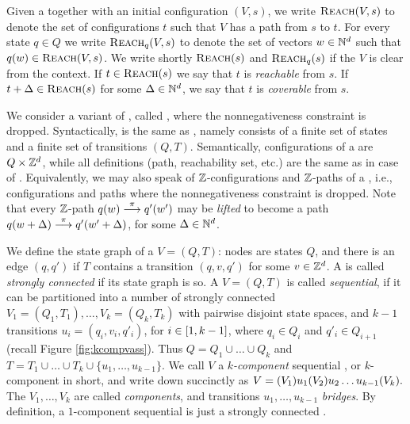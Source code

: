Given a \vass together with an initial configuration $(V, s)$, we write 
$\textsc{Reach}(V,s)$ to denote the set of configurations $t$ such that $V$ has a path from $s$ to $t$.
For every state $q\in Q$ we write $\textsc{Reach}_q(V,s)$ to denote the
set of vectors $w\in\mathbb{N}^d$ such that $q(w) \in \textsc{Reach}(V,s)$.
We write shortly $\textsc{Reach}(s)$ and $\textsc{Reach}_q(s)$ if the \vass $V$
is clear from the context.
If $t\in\textsc{Reach}(s)$ we say that $t$ is \emph{reachable} from $s$.
If $t+\Delta\in\textsc{Reach}(s)$ for some $\Delta\in\mathbb{N}^d$, we say that $t$ is \emph{coverable} from $s$.

We consider a variant of \vass, called \zvass, where the nonnegativeness constraint is dropped.
Syntactically, \zvass is the same as \vass, namely consists of a finite set of states and a finite set of transitions
$(Q, T)$. 
Semantically, configurations of a \zvass are $Q \times \mathbb{Z}^d$, while
all definitions (path, reachability set, etc.) are the same as in case of \vass.
Equivalently, we may also speak of $\mathbb{Z}$-configurations and $\mathbb{Z}$-paths of a \vass, i.e., 
configurations and paths where the nonnegativeness constraint is dropped.
Note that every $\mathbb{Z}$-path $q(w) \stackrel{\pi}{\longrightarrow} q'(w')$ may be \emph{lifted} to become a path
$q(w+\Delta) \stackrel{\pi}{\longrightarrow} q'(w'+\Delta)$, for some $\Delta \in \mathbb{N}^d$.



We define the state graph of a \vass $V = (Q, T)$: nodes are states $Q$, and there is an edge
$(q,q')$ if $T$ contains a transition $(q, v, q')$ for some $v\in\mathbb{Z}^d$.
A \vass is called \emph{strongly connected} if its state graph is so.
A \vass $V = (Q, T)$ is called \emph{sequential},
if it can be partitioned into a number of strongly connected 
\vass $V_1=(Q_1, T_1), \ldots, V_k=(Q_k, T_k)$ with pairwise disjoint state spaces, 
and $k-1$ transitions
$u_i=(q_i, v_i, q'_i)$, for $i\in[1, k-1]$, where $q_i\in Q_i$ and $q'_i \in Q_{i+1}$
(recall Figure \ref{fig:kcompvass}).
%
Thus $Q=Q_1\cup\ldots\cup Q_k$ and 
$T=T_1 \cup \ldots \cup T_k \cup \{u_1, \ldots, u_{k-1}\}$.
We call $V$ a \emph{$k$-component} sequential \vass,
or $k$-component \vass in short,
and write down succinctly as 
$
V  =  (V_1) u_1 (V_2) u_2 \ldots u_{k-1} (V_k).
$
The \vass $V_1, \ldots, V_k$ are called \emph{components}, and transitions
$u_1, \ldots, u_{k-1}$  \emph{bridges}.
By definition, a $1$-component sequential \vass is just a strongly connected \vass.



